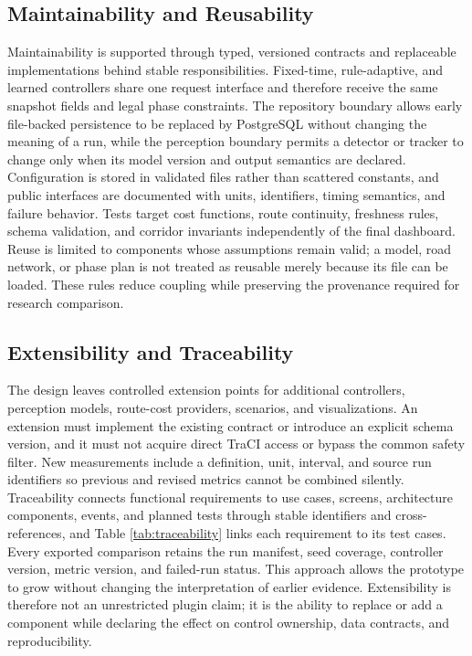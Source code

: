 \subsection{Maintainability and Reusability}

Maintainability is supported through typed, versioned contracts and replaceable implementations behind stable responsibilities. Fixed-time, rule-adaptive, and learned controllers share one request interface and therefore receive the same snapshot fields and legal phase constraints. The repository boundary allows early file-backed persistence to be replaced by PostgreSQL without changing the meaning of a run, while the perception boundary permits a detector or tracker to change only when its model version and output semantics are declared. Configuration is stored in validated files rather than scattered constants, and public interfaces are documented with units, identifiers, timing semantics, and failure behavior. Tests target cost functions, route continuity, freshness rules, schema validation, and corridor invariants independently of the final dashboard. Reuse is limited to components whose assumptions remain valid; a model, road network, or phase plan is not treated as reusable merely because its file can be loaded. These rules reduce coupling while preserving the provenance required for research comparison.

\subsection{Extensibility and Traceability}

The design leaves controlled extension points for additional controllers, perception models, route-cost providers, scenarios, and visualizations. An extension must implement the existing contract or introduce an explicit schema version, and it must not acquire direct TraCI access or bypass the common safety filter. New measurements include a definition, unit, interval, and source run identifiers so previous and revised metrics cannot be combined silently. Traceability connects functional requirements to use cases, screens, architecture components, events, and planned tests through stable identifiers and cross-references, and Table \ref{tab:traceability} links each requirement to its test cases. Every exported comparison retains the run manifest, seed coverage, controller version, metric version, and failed-run status. This approach allows the prototype to grow without changing the interpretation of earlier evidence. Extensibility is therefore not an unrestricted plugin claim; it is the ability to replace or add a component while declaring the effect on control ownership, data contracts, and reproducibility.


